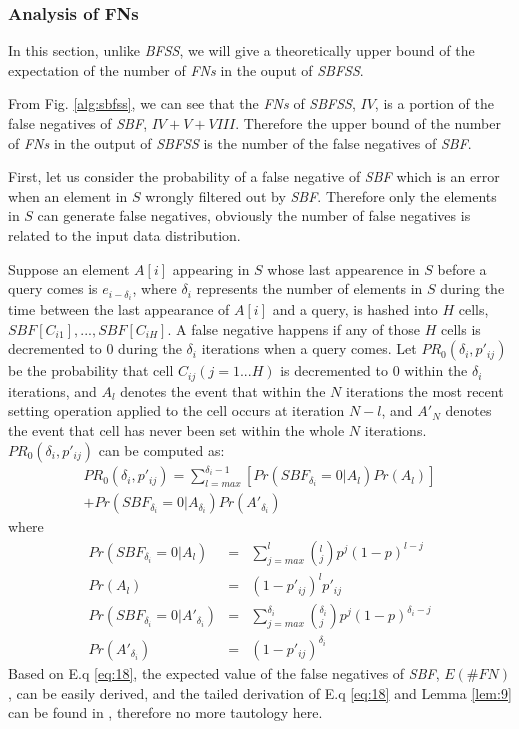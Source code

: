 \documentclass[conference]{IEEEtran}
\begin{document}
\subsubsection{\textbf{Analysis of FNs}}
In this section, unlike \emph{BFSS}, we will give a theoretically upper bound of the expectation of the number of \emph{FNs} in the ouput of \emph{SBFSS}. \par
From Fig. \ref{alg:sbfss}, we can see that the \emph{FNs} of \emph{SBFSS}, $IV$, is a portion of the false negatives of \emph{SBF}, $IV+V+VIII$. Therefore the upper bound of the number of \emph{FNs} in the output of \emph{SBFSS} is the number of the false negatives of \emph{SBF}.\par
First, let us consider the probability of a false negative of \emph{SBF} which is an error when an element in $S$ wrongly filtered out by \emph{SBF}. Therefore only the elements in $S$ can generate false negatives, obviously the number of false negatives is related to the input data distribution.\par
Suppose an element $A[i]$ appearing in $S$ whose last appearence in $S$ before a query comes is $e_{i-\delta_i}$, where $\delta_i$ represents the number of elements in $S$ during the time between the last appearance of $A[i]$ and a query, is hashed into $H$ cells, $SBF[C_{i1}],...,SBF[C_{iH}]$. A false negative happens if any of those $H$ cells is decremented to 0 during the $\delta_i$ iterations when a query comes. Let $PR_0(\delta_i,p'_{ij})$ be the probability that cell $C_{ij} (j = 1...H)$ is decremented to 0 within the $\delta_i$ iterations, and $A_l$ denotes the event that within the $N$ iterations the most recent setting operation applied to the cell occurs at iteration $N-l$, and $A'_N$ denotes the event that cell has never been set within the whole $N$ iterations. $PR_0(\delta_i,p'_{ij})$ can be computed as:
\begin{equation}\label{eq:18}
\begin{split}
PR_0(\delta_i,p'_{ij})=\sum_{l=max}^{\delta_i-1}[Pr(SBF_{\delta_i}=0|A_l)Pr(A_l)]\\
+Pr(SBF_{\delta_i}=0|A_{\delta_i})Pr(A'_{\delta_i})
\end{split}
\end{equation}
where 
\setlength{\arraycolsep}{0.0em}
\begin{eqnarray}\label{eq:19}
Pr(SBF_{\delta_i}=0|A_l)&=&\sum_{j=max}^{l}\left(^l_j\right)p^j(1-p)^{l-j}\\
Pr(A_l)&=&(1-p'_{ij})^lp'_{ij}\\
Pr(SBF_{\delta_i}=0|A'_{\delta_i})&=&\sum_{j=max}^{\delta_i}\left(^{\delta_i}_j\right)p^j(1-p)^{\delta_i-j}\\
Pr(A'_{\delta_i})&=&(1-p'_{ij})^{\delta_i}
\end{eqnarray}
\setlength{\arraycolsep}{5pt}
Based on E.q \ref{eq:18}, the expected value of the false negatives of \emph{SBF}, $E(\#FN)$, can be easily derived, and the tailed derivation of E.q \ref{eq:18} and Lemma \ref{lem:9} can be found in \cite{IEEEexample:sbf}, therefore no more tautology here.\par
\end{document}
